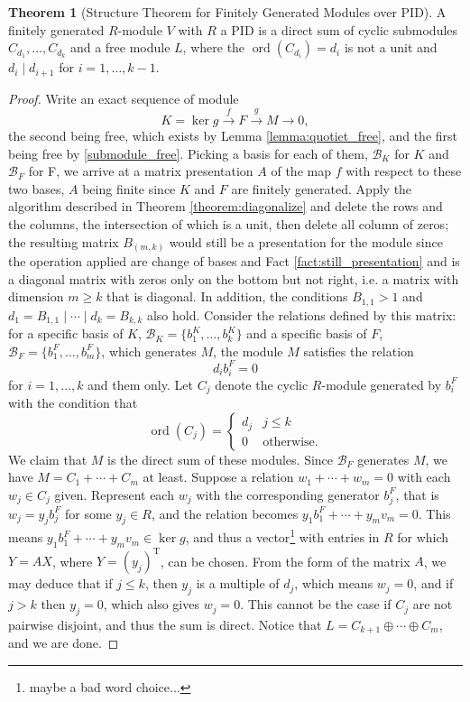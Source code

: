 \documentclass[10pt]{report}
\theoremstyle{definition}
\newtheorem{theorem}{Theorem}
\begin{document}
\begin{theorem}[Structure Theorem for Finitely Generated Modules over PID]
A finitely generated $R$-module $V$ with $R$ a PID is a direct sum of cyclic submodules $C_{d_1},\dots,C_{d_k}$ and a free module $L$, where the $\operatorname{ord}(C_{d_i})=d_i$ is not a unit and $d_i\mathbin{|}d_{i+1}$ for $i=1,\dots,k-1$.
\end{theorem}
\begin{proof}
Write an exact sequence of module
$$
K=\ker g\overset{f}{\to}F\overset{g}{\to}M\to0,
$$
the second being free, which exists by Lemma \ref{lemma:quotiet_free}, and the first being free by \ref{submodule_free}.
Picking a basis for each of them, $\mathcal{B}_K$ for $K$ and $\mathcal{B}_F$ for F, we arrive at a matrix presentation $A$ of the map $f$ with respect to these two bases, $A$ being finite since $K$ and $F$ are finitely generated. Apply the algorithm described in Theorem \ref{theorem:diagonalize} and delete the rows and the columns, the intersection of which is a unit, then delete all column of zeros; the resulting matrix $B_{(m,k)}$ would still be a presentation for the module since the operation applied are change of bases and Fact \ref{fact:still_presentation} and is a diagonal matrix with zeros only on the bottom but not right, i.e. a matrix with dimension $m\geq k$ that is diagonal. In addition, the conditions $B_{1,1}>1$ and $d_1=B_{1,1}\mathbin{|}\cdots\mathbin{|}d_k=B_{k,k}$ also hold.
Consider the relations defined by this matrix: for a specific basis of $K$, $\mathcal{B}_K=\{b^K_1,\dots,b^K_k\}$ and a specific basis of $F$, $\mathcal{B}_F=\{b^F_1,\dots,b^F_m\}$, which generates $M$, the module $M$ satisfies the relation $$d_ib^F_i=0$$ for $i=1,\dots,k$ and them only. Let $C_j$ denote the cyclic $R$-module generated by $b^F_i$ with the condition that
$$\operatorname{ord}(C_j)=\begin{cases}d_j&j\leq k\\0&\mbox{otherwise}.\end{cases}$$
We claim that $M$ is the direct sum of these modules. Since $\mathcal{B}_F$ generates $M$, we have $M=C_1+\cdots+C_m$ at least. Suppose a relation $w_1+\cdots+w_m=0$ with each $w_j\in C_j$ given. Represent each $w_j$ with the corresponding generator $b^F_j$, that is $w_j=y_jb^F_j$ for some $y_j\in R$, and the relation becomes $y_1b^F_1+\cdots+y_mv_m=0$. This means $y_1b^F_1+\cdots+y_mv_m\in\ker g$, and thus a vector\footnote{maybe a bad word choice...} with entries in $R$ for which $Y=AX$, where $Y=(y_j)^\mathrm{T}$, can be chosen. From the form of the matrix $A$, we may deduce that if $j\leq k$, then $y_j$ is a multiple of $d_j$, which means $w_j=0$, and if $j>k$ then $y_j=0$, which also gives $w_j=0$. This cannot be the case if $C_j$ are not pairwise disjoint, and thus the sum is direct. Notice that $L=C_{k+1}\oplus\cdots\oplus C_m$, and we are done.
\end{proof}
\end{document}
